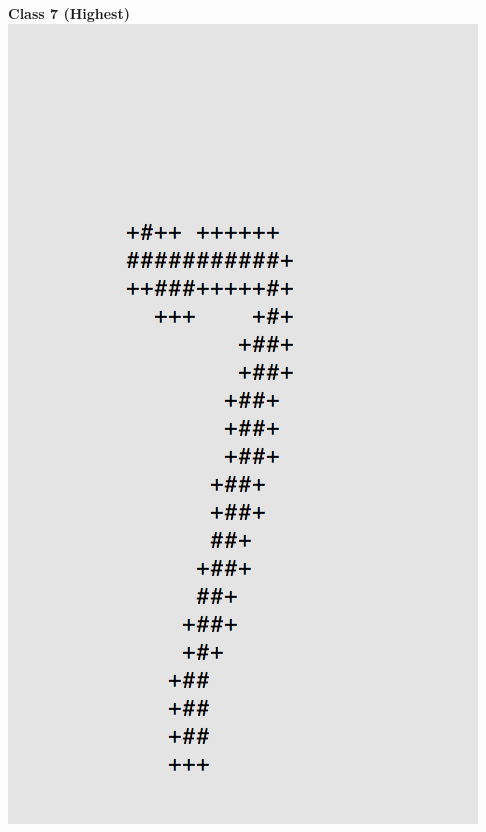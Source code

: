 \documentclass[11pt]{article}
\begin{document}
\begin{center}
\begin{multicols}{2}
\textbf{Class 7 (Highest)}\\
\includegraphics[scale=0.4]{part1/1/high_7.png}


\end{multicols}
\end{center}
\end{document}
